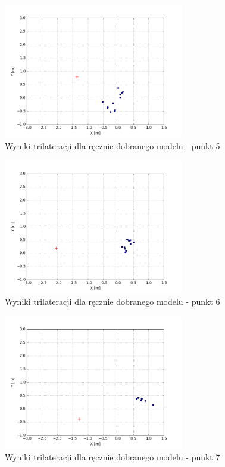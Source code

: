\begin{figure}[H]
\centering
\includegraphics[width=0.7\textwidth]{img/trilat-map3-5.png}
\caption{Wyniki trilateracji dla ręcznie dobranego modelu - punkt 5}
\end{figure}
\begin{figure}[H]
\centering
\includegraphics[width=0.7\textwidth]{img/trilat-map3-6.png}
\caption{Wyniki trilateracji dla ręcznie dobranego modelu - punkt 6}
\end{figure}
\begin{figure}[H]
\centering
\includegraphics[width=0.7\textwidth]{img/trilat-map3-7.png}
\caption{Wyniki trilateracji dla ręcznie dobranego modelu - punkt 7}
\end{figure}
